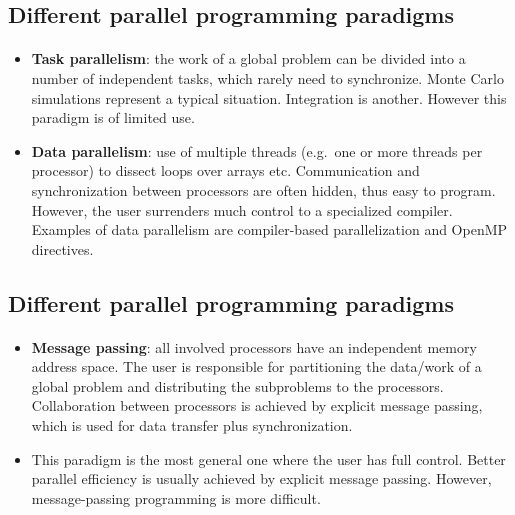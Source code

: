 \subsection*{Different parallel programming paradigms}

\paragraph{}

\begin{itemize}
\item \textbf{Task parallelism}:  the work of a global problem can be divided into a number of independent tasks, which rarely need to synchronize.  Monte Carlo simulations represent a typical situation. Integration is another. However this paradigm is of limited use.

\item \textbf{Data parallelism}:  use of multiple threads (e.g.~one or more threads per processor) to dissect loops over arrays etc.  Communication and synchronization between processors are often hidden, thus easy to program. However, the user surrenders much control to a specialized compiler. Examples of data parallelism are compiler-based parallelization and OpenMP directives. 
\end{itemize}

\noindent



\subsection*{Different parallel programming paradigms}

\paragraph{}

\begin{itemize}
\item \textbf{Message passing}:  all involved processors have an independent memory address space. The user is responsible for  partitioning the data/work of a global problem and distributing the  subproblems to the processors. Collaboration between processors is achieved by explicit message passing, which is used for data transfer plus synchronization.

\item This paradigm is the most general one where the user has full control. Better parallel efficiency is usually achieved by explicit message passing. However, message-passing programming is more difficult.
\end{itemize}

